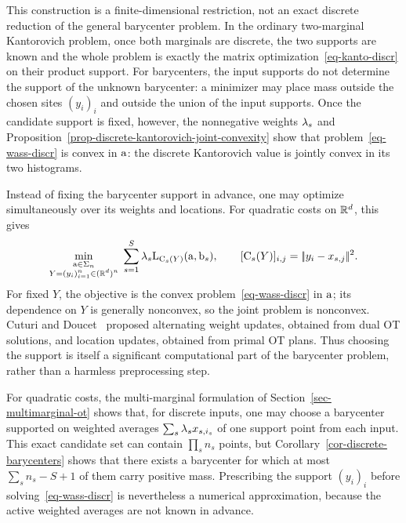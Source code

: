 This construction is a finite-dimensional restriction, not an exact discrete reduction of the general barycenter problem. In the ordinary two-marginal Kantorovich problem, once both marginals are discrete, the two supports are known and the whole problem is exactly the matrix optimization~\eqref{eq-kanto-discr} on their product support. For barycenters, the input supports do not determine the support of the unknown barycenter: a minimizer may place mass outside the chosen sites $(y_i)_i$ and outside the union of the input supports. Once the candidate support is fixed, however, the nonnegative weights $\lambda_s$ and Proposition~\ref{prop-discrete-kantorovich-joint-convexity} show that problem~\eqref{eq-wass-discr} is convex in $\mathrm{a}$: the discrete Kantorovich value is jointly convex in its two histograms.

Instead of fixing the barycenter support in advance, one may optimize simultaneously over its weights and locations. For quadratic costs on $\mathbb{R}^d$, this gives
\[
	\underset{\substack{\mathrm{a}\in\Sigma_n\\Y=(y_i)_{i=1}^n\in(\mathbb{R}^d)^n}}{\min}\;
	\sum_{s=1}^S\lambda_s\mathrm{L}_{\mathrm{C}_s(Y)}(\mathrm{a},\mathrm{b}_s),
	\qquad
	[\mathrm{C}_s(Y)]_{i,j}=|\!| y_i-x_{s,j} |\!|^2.
\]
For fixed $Y$, the objective is the convex problem~\eqref{eq-wass-discr} in $\mathrm{a}$; its dependence on $Y$ is generally nonconvex, so the joint problem is nonconvex. Cuturi and Doucet~\cite{CuturiBarycenter} proposed alternating weight updates, obtained from dual OT solutions, and location updates, obtained from primal OT plans. Thus choosing the support is itself a significant computational part of the barycenter problem, rather than a harmless preprocessing step.

For quadratic costs, the multi-marginal formulation of Section~\ref{sec-multimarginal-ot} shows that, for discrete inputs, one may choose a barycenter supported on weighted averages $\sum_s\lambda_s x_{s,i_s}$ of one support point from each input. This exact candidate set can contain $\prod_s n_s$ points, but Corollary~\ref{cor-discrete-barycenters} shows that there exists a barycenter for which at most $\sum_s n_s-S+1$ of them carry positive mass. Prescribing the support $(y_i)_i$ before solving~\eqref{eq-wass-discr} is nevertheless a numerical approximation, because the active weighted averages are not known in advance.

